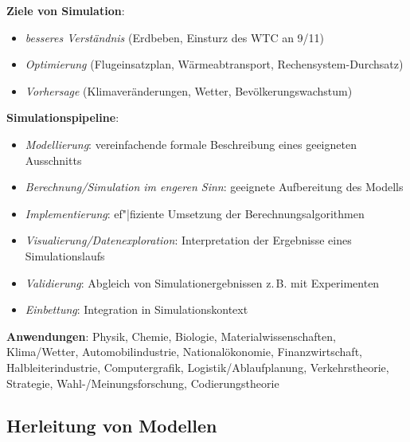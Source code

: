 \textbf{Ziele von Simulation}:
\begin{itemize}
    \item
    \emph{besseres Verständnis}
    (Erdbeben, Einsturz des WTC an 9/11)
    
    \item
    \emph{Optimierung}
    (Flugeinsatzplan, Wärmeabtransport, Rechensystem-Durchsatz)
    
    \item
    \emph{Vorhersage}
    (Klimaveränderungen, Wetter, Bevölkerungswachstum)
\end{itemize}

\linie

\textbf{Simulationspipeline}:
\begin{itemize}
    \item
    \emph{Modellierung}:
    vereinfachende formale Beschreibung eines geeigneten Ausschnitts
    
    \item
    \emph{Berechnung/Simulation im engeren Sinn}:
    geeignete Aufbereitung des Modells
    
    \item
    \emph{Implementierung}:
    ef"|fiziente Umsetzung der Berechnungsalgorithmen
    
    \item
    \emph{Visualierung/Datenexploration}:
    Interpretation der Ergebnisse eines Simulationslaufs
    
    \item
    \emph{Validierung}:
    Abgleich von Simulationergebnissen z.\,B. mit Experimenten
    
    \item
    \emph{Einbettung}:
    Integration in Simulationskontext
\end{itemize}

\linie

\textbf{Anwendungen}:
Physik,
Chemie,
Biologie,
Materialwissenschaften,
Klima/Wetter,
Automobilindustrie,
Nationalökonomie,
Finanzwirtschaft,
Halbleiterindustrie,
Computergrafik,
Logistik/Ablaufplanung,
Verkehrstheorie,
Strategie,
Wahl-/Meinungsforschung,
Codierungstheorie

\pagebreak

\subsection{%
    Herleitung von Modellen%
}

